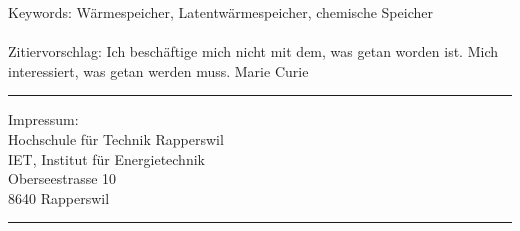  \vspace*{12.5cm}
\begin{minipage}{80mm}
	Keywords: Wärmespeicher, Latentwärmespeicher, chemische Speicher
 \\
	\\
	Zitiervorschlag: 
	Ich beschäftige mich nicht mit dem, was getan worden ist. Mich interessiert, was getan werden muss. Marie Curie
	\vspace{1cm}


  \rule{80mm}{2pt}
  Impressum: \\
  Hochschule für Technik Rapperswil \\
  IET, Institut für Energietechnik \\ 
  Oberseestrasse 10 \\
  8640 Rapperswil\\
  \rule{80mm}{2pt}
\end{minipage}
\newpage

